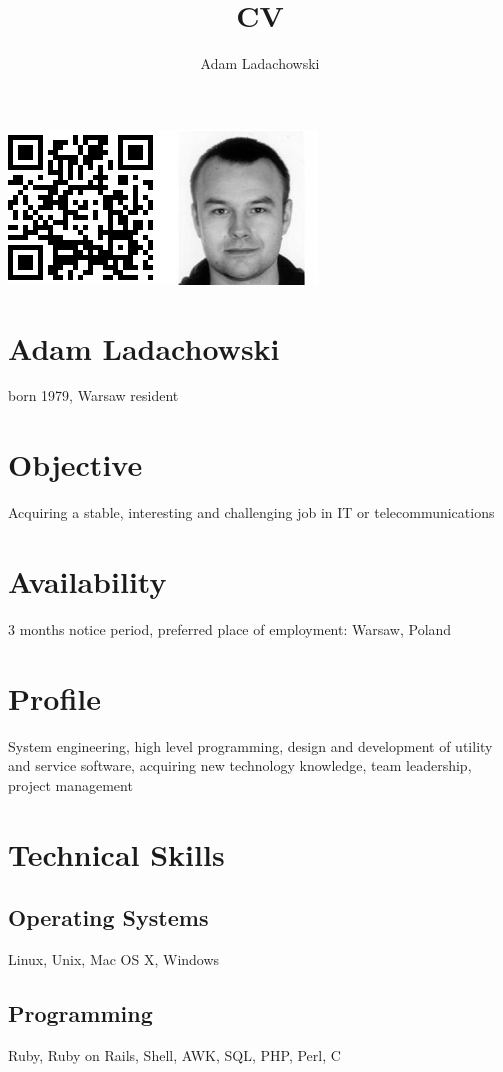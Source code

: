 \documentclass[9pt,a4paper,twocolumn]{extarticle}
\title{CV}
\author{Adam Ladachowski}
\begin{document}
\includegraphics[width=\columnwidth]{photo_qr.png}

\section*{Adam Ladachowski}
born 1979, Warsaw resident

\section*{Objective}

Acquiring a stable, interesting and challenging job in IT or telecommunications

\section*{Availability}

3 months notice period, preferred place of employment: Warsaw, Poland

\section*{Profile}

System engineering, high level programming, design and development of utility and service software, acquiring new technology knowledge, team leadership, project management

\section*{Technical Skills}

\subsection*{Operating Systems}
Linux, Unix, Mac OS X, Windows
\subsection*{Programming}
Ruby, Ruby on Rails, Shell, AWK, SQL, PHP, Perl, C
\end{document}
